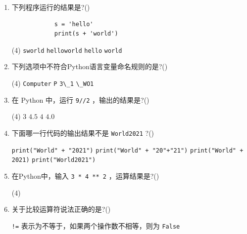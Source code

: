 \documentclass[11pt]{ctexart}
\begin{document}
    \begin{enumerate}
        \item 下列程序运行的结果是?(\qquad)
        \begin{lstlisting}
            s = 'hello'
            print(s + 'world')
        \end{lstlisting}
        \begin{tasks}(4)
            \task \lstinline{sworld}
            \task \lstinline{helloworld}
            \task \lstinline{hello}
            \task \lstinline{world}
        \end{tasks}
    
        \item 下列选项中不符合Python语言变量命名规则的是?(\qquad)
        \begin{tasks}(4)
            \task \lstinline{Computer}
            \task \lstinline{P}
            \task \lstinline{3\_1}
            \task \lstinline{\_WO1}
        \end{tasks}

        \item 在 Python 中，运行 \lstinline!9//2! ，输出的结果是?(\qquad)
        \begin{tasks}(4)
            \task $3$
            \task $4.5$
            \task $4$
            \task $4.0$
        \end{tasks}
    
        \item 下面哪一行代码的输出结果不是 \lstinline{World2021} ?(\qquad)
        \begin{tasks}
            \task \lstinline!print("World" + "2021")!
            \task \lstinline!print("World" + "20"+"21")!
            \task \lstinline!print("World" + 2021)!
            \task \lstinline!print("World2021")!
        \end{tasks}

        \item 在Python中，输入 \lstinline!3 * 4 ** 2! ，运算结果是?(\qquad)
        \begin{tasks}(4)
        \end{tasks}

        \item 关于比较运算符说法正确的是?(\qquad)
        
         \lstinline{!=} 表示为不等于，如果两个操作数不相等，则为 \lstinline{False}


\end{enumerate}
\end{document}
